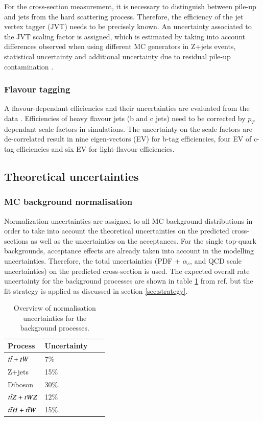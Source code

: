 For the cross-section measurement, it is necessary to distinguish between pile-up and jets from the hard scattering process. Therefore, the efficiency of the jet vertex tagger (JVT) needs to be precisely known. An uncertainty associated to the JVT scaling factor is assigned, which is estimated by taking into account differences observed when using different MC generators in Z+jets events, statistical uncertainty and additional uncertainty due to residual pile-up contamination \cite{ATLAS:2015ull}.

\subsubsection{Flavour tagging}

A flavour-dependant efficiencies and their uncertainties are evaluated from the data \cite{ATLAS:2015dex}. Efficiencies of heavy flavour jets (b and c jets) need to be corrected by $p_{T}$ dependant scale factors in simulations. The
 uncertainty on the scale factors are de-correlated result in nine eigen-vectors (EV) for b-tag efficiencies,
four EV of c-tag efficiencies and six EV for light-flavour efficiencies.

\subsection{Theoretical uncertainties}

\subsubsection{MC background normalisation}
Normalization uncertainties are assigned to all MC background distributions in order to take into account the theoretical uncertainties on the predicted cross-sections as well as the uncertainties on the acceptances. For the single top-quark backgrounds, acceptance effects are already taken into account in the modelling uncertainties. Therefore, the total uncertainties (PDF + $\alpha_{s}$, and QCD scale uncertainties) on the predicted cross-section is used. The expected overall rate uncertainty for the background processes are shown in table \ref{tab:mcbackroundnormalixation} from ref.\cite{tZq2018} but the fit strategy is applied as discussed in section \ref{sec:strategy}. 

\begin{table}[h!]
     \centering
      \begin{tabular}{@{} *4l  @{}}
      \toprule
       Process & Uncertainty \\
     \midrule
      $t\Bar{t} + tW $ & 7\% \\[0.2ex]
      Z+jets &  15\%\\[0.2ex]
      Diboson  &  30\% \\[0.2ex]
      $t\Bar{t}Z + tWZ$ & 12\% \\[0.2ex]
     $t\Bar{t}H + t\Bar{t}W $ &  15\% \\[0.2ex]
      \bottomrule
 \end{tabular}
 \caption{Overview of normalisation uncertainties for the background processes.}
 \label{tab:mcbackroundnormalixation}
 \end{table}
 
